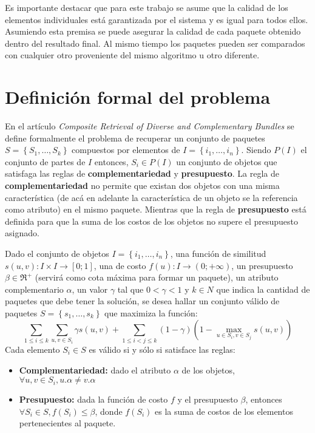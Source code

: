 Es importante destacar que para este trabajo se asume que la calidad de los elementos individuales está garantizada por el sistema y es igual para todos ellos. Asumiendo esta premisa se puede asegurar la calidad de cada paquete obtenido dentro del resultado final. Al mismo tiempo los paquetes pueden ser comparados con cualquier otro proveniente del mismo algoritmo u otro diferente.

\section{Definición formal del problema}\label{introduccion:problemaFormal}
En el artículo {\em Composite Retrieval of Diverse and Complementary Bundles} \cite{journals/tkde/Amer-YahiaBCFMZ14} se define formalmente el problema de recuperar un conjunto de paquetes $S = \left\{S_1, \ldots, S_k\right\}$ compuestos por elementos de $I=\left\{i_1,\ldots, i_n\right\}$. Siendo $P(I)$ el conjunto de partes de $I$ entonces,  $S_i \in P(I)$ un conjunto de objetos que satisfaga las reglas de \textbf{complementariedad} y \textbf{presupuesto}. La regla de \textbf{complementariedad} no permite que existan dos objetos con una misma característica (de acá en adelante la característica de un objeto se la referencia como atributo) en el mismo paquete. Mientras que la regla de \textbf{presupuesto} está definida para que la suma de los costos de los objetos no supere el presupuesto asignado.

Dado el conjunto de objetos $I=\left\{i_1,\ldots, i_n\right\}$, una función de similitud $s(u,v): I \times I \rightarrow [0;1]$, una de costo $f(u): I \rightarrow (0;+\infty)$, un presupuesto $\beta \in \Re^{+}$ (servirá como cota máxima para formar un paquete), un atributo complementario $\alpha$, un valor $\gamma$ tal que $0 < \gamma < 1$ y $k \in N$ que indica la cantidad de paquetes que debe tener la solución, se desea hallar un conjunto válido de paquetes $S = \left\{s_1, \ldots, s_k\right\}$ que maximiza la función:
\begin{equation} \label{des:eq-fnObj}
\sum_{1 \leq i \leq k}{\sum_{u,v \in S_i}{\gamma s(u,v)}} + \sum_{1 \leq i < j \leq k}{(1-\gamma) (1-\max_{u \in S_i, v \in S_j}{s(u,v)})}
\end{equation}
Cada elemento $S_i \in S$ es válido si y sólo si satisface las reglas:
\begin{itemize}
	\item \textbf{Complementariedad:} dado el atributo $\alpha$ de los objetos, $\forall u,v \in S_i, u.\alpha \neq v.\alpha$
	\item \textbf{Presupuesto:} dada la función de costo $f$ y el presupuesto $\beta$, entonces $\forall S_i \in S, f(S_i) \leq \beta$, donde $f(S_i)$ es la suma de costos de los elementos pertenecientes al paquete.
\end{itemize}		  

